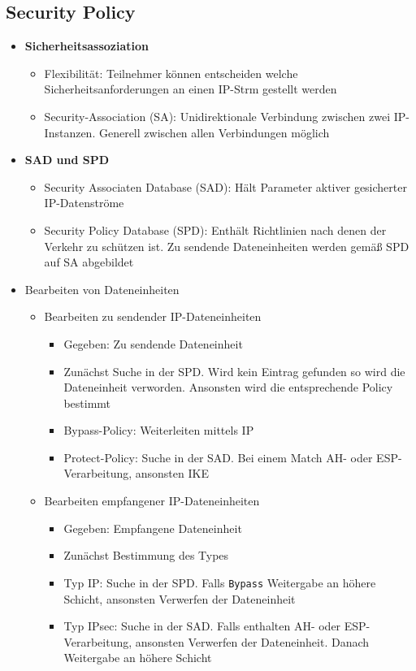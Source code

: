 \subsection{Security Policy}
\begin{itemize}
	\item \textbf{Sicherheitsassoziation}
	\begin{itemize}
		\item Flexibilität: Teilnehmer können entscheiden welche Sicherheitsanforderungen an einen IP-Strm gestellt werden
		\item Security-Association (SA): Unidirektionale Verbindung zwischen zwei IP-Instanzen. Generell zwischen allen Verbindungen möglich
	\end{itemize}
	\item \textbf{SAD und SPD}
	\begin{itemize}
		\item Security Associaten Database (SAD): Hält Parameter aktiver gesicherter IP-Datenströme
		\item Security Policy Database (SPD): Enthält Richtlinien nach denen der Verkehr zu schützen ist. Zu sendende Dateneinheiten werden gemäß SPD auf SA abgebildet
	\end{itemize}
	\item Bearbeiten von Dateneinheiten
	\begin{itemize}
		\item Bearbeiten zu sendender IP-Dateneinheiten
		\begin{itemize}
			\item Gegeben: Zu sendende Dateneinheit
			\item Zunächst Suche in der SPD. Wird kein Eintrag gefunden so wird die Dateneinheit verworden. Ansonsten wird die entsprechende Policy bestimmt
			\item Bypass-Policy: Weiterleiten mittels IP
			\item Protect-Policy: Suche in der SAD. Bei einem Match AH- oder ESP-Verarbeitung, ansonsten IKE
		\end{itemize}
		\item Bearbeiten empfangener IP-Dateneinheiten
		\begin{itemize}
			\item Gegeben: Empfangene Dateneinheit
			\item Zunächst Bestimmung des Types
			\item Typ IP: Suche in der SPD. Falls \texttt{Bypass} Weitergabe an höhere Schicht, ansonsten Verwerfen der Dateneinheit
			\item Typ IPsec: Suche in der SAD. Falls enthalten AH- oder ESP-Verarbeitung, ansonsten Verwerfen der Dateneinheit. Danach Weitergabe an höhere Schicht
		\end{itemize}
	\end{itemize}
\end{itemize}


